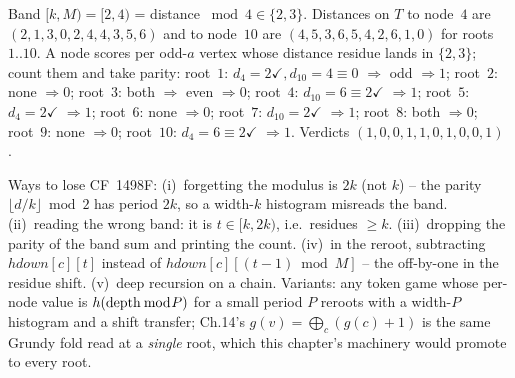 \begin{tracebox}[Running-tree overlay: $T$, $k=2$ ($M=4$), odd-$a$ nodes $\{4,10\}$]
Band $[k,M)=[2,4)$ = distance $\bmod 4 \in \{2,3\}$. Distances on $T$ to node~$4$
are $(2,1,3,0,2,4,4,3,5,6)$ and to node~$10$ are $(4,5,3,6,5,4,2,6,1,0)$ for roots
$1..10$. A node scores per odd-$a$ vertex whose distance residue lands in $\{2,3\}$;
count them and take parity:
root~$1$: $d_4{=}2\checkmark, d_{10}{=}4{\equiv}0$ $\Rightarrow$ odd $\Rightarrow 1$;
root~$2$: none $\Rightarrow 0$; root~$3$: both $\Rightarrow$ even $\Rightarrow 0$;
root~$4$: $d_{10}{=}6{\equiv}2\checkmark$ $\Rightarrow 1$; root~$5$: $d_4{=}2\checkmark$
$\Rightarrow 1$; root~$6$: none $\Rightarrow 0$; root~$7$: $d_{10}{=}2\checkmark$
$\Rightarrow 1$; root~$8$: both $\Rightarrow 0$; root~$9$: none $\Rightarrow 0$;
root~$10$: $d_4{=}6{\equiv}2\checkmark$ $\Rightarrow 1$.
Verdicts $(1,0,0,1,1,0,1,0,0,1)$ \checkmark.
\end{tracebox}


\begin{warningbox}
Ways to lose CF~1498F: (i)~forgetting the modulus is $2k$ (not $k$) -- the parity
$\lfloor d/k\rfloor\bmod2$ has period $2k$, so a width-$k$ histogram misreads the
band. (ii)~reading the wrong band: it is $t\in[k,2k)$, i.e.\ residues $\ge k$.
(iii)~dropping the parity of the band sum and printing the count. (iv)~in the
reroot, subtracting $\mathit{hdown}[c][t]$ instead of $\mathit{hdown}[c][(t{-}1)\bmod
M]$ -- the off-by-one in the residue shift. (v)~deep recursion on a chain. Variants:
any token game whose per-node value is $h(\operatorname{depth} \bmod P)$ for a small period $P$
reroots with a width-$P$ histogram and a shift transfer; Ch.14's 
$g(v)=\bigoplus_c(g(c)+1)$ is the same Grundy fold read at a \emph{single} root, which
this chapter's machinery would promote to every root.
\end{warningbox}

